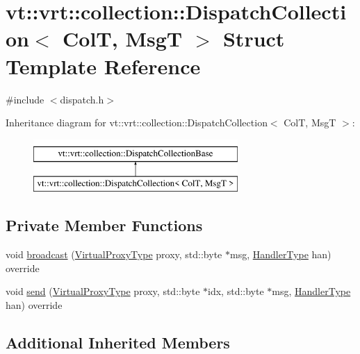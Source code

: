 \hypertarget{structvt_1_1vrt_1_1collection_1_1_dispatch_collection}{}\section{vt\+:\+:vrt\+:\+:collection\+:\+:Dispatch\+Collection$<$ ColT, MsgT $>$ Struct Template Reference}
\label{structvt_1_1vrt_1_1collection_1_1_dispatch_collection}


{\ttfamily \#include $<$dispatch.\+h$>$}

Inheritance diagram for vt\+:\+:vrt\+:\+:collection\+:\+:Dispatch\+Collection$<$ ColT, MsgT $>$\+:\begin{figure}[H]
\begin{center}
\leavevmode
\includegraphics[height=2.000000cm]{structvt_1_1vrt_1_1collection_1_1_dispatch_collection}
\end{center}
\end{figure}
\subsection*{Private Member Functions}
\begin{DoxyCompactItemize}
\item 
void \hyperlink{structvt_1_1vrt_1_1collection_1_1_dispatch_collection_a15fb496ed66606dd9feeb5ff80138ccf}{broadcast} (\hyperlink{namespacevt_a1b417dd5d684f045bb58a0ede70045ac}{Virtual\+Proxy\+Type} proxy, std\+::byte $\ast$msg, \hyperlink{namespacevt_af64846b57dfcaf104da3ef6967917573}{Handler\+Type} han) override
\item 
void \hyperlink{structvt_1_1vrt_1_1collection_1_1_dispatch_collection_a24880789074a425cc71588119f1ccea7}{send} (\hyperlink{namespacevt_a1b417dd5d684f045bb58a0ede70045ac}{Virtual\+Proxy\+Type} proxy, std\+::byte $\ast$idx, std\+::byte $\ast$msg, \hyperlink{namespacevt_af64846b57dfcaf104da3ef6967917573}{Handler\+Type} han) override
\end{DoxyCompactItemize}
\subsection*{Additional Inherited Members}


